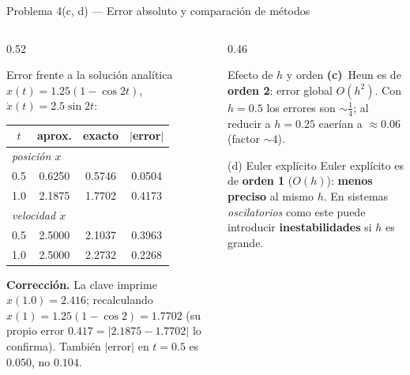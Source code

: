 \documentclass[aspectratio=169,10pt]{beamer}
\begin{document}
\begin{frame}{Problema 4(c, d) — Error absoluto y comparación de métodos}
\begin{columns}[T]
\begin{column}{0.52\textwidth}
\begin{cardgear}{Error frente a la solución analítica}{\faTable}
{\footnotesize $x(t)=1.25(1-\cos 2t)$,\ $\dot x(t)=2.5\sin 2t$:}\\[1mm]
\centering
{\scriptsize\renewcommand{\arraystretch}{1.25}\setlength{\tabcolsep}{4.5pt}
\begin{tabular}{c|cc|c}
$t$ & aprox. & exacto & $|$error$|$\\\hline
\multicolumn{4}{l}{\itshape posición $x$}\\
0.5 & 0.6250 & 0.5746 & 0.0504\\
1.0 & 2.1875 & 1.7702 & 0.4173\\\hline
\multicolumn{4}{l}{\itshape velocidad $\dot x$}\\
0.5 & 2.5000 & 2.1037 & 0.3963\\
1.0 & 2.5000 & 2.2732 & 0.2268\\
\end{tabular}}
\end{cardgear}
\vspace{1mm}
\begin{cardnota}[\faExclamationTriangle]
{\scriptsize \textbf{Corrección.} La clave imprime $x(1.0)=2.416$; recalculando $x(1)=1.25(1-\cos 2)=1.7702$ (su propio error $0.417=|2.1875-1.7702|$ lo confirma). También $|$error$|$ en $t{=}0.5$ es $0.050$, no $0.104$.}
\end{cardnota}
\end{column}
\begin{column}{0.46\textwidth}
\begin{cardidea}{Efecto de $h$ y orden}{\faLightbulb}
{\footnotesize \textbf{(c)}\ Heun es de \textbf{orden 2}: error global $O(h^2)$. Con $h=0.5$ los errores son $\sim\!\tfrac14$; al reducir a $h=0.25$ caerían a $\approx0.06$ (factor $\sim4$).}
\end{cardidea}
\vspace{1mm}
\begin{cardidea}{(d) Euler explícito}{\faExclamationTriangle}
{\footnotesize Euler explícito es de \textbf{orden 1} ($O(h)$): \textbf{menos preciso} al mismo $h$. En sistemas \emph{oscilatorios} como este puede introducir \textbf{inestabilidades} si $h$ es grande.}
\end{cardidea}
\end{column}
\end{columns}
\end{frame}
\end{document}
